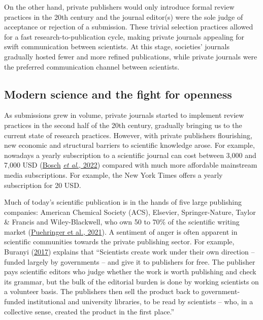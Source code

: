 \documentclass[
]{book}
\begin{document}
On the other hand, private publishers would only introduce formal review practices in the 20th century and the journal editor(s) were the sole judge of acceptance or rejection of a submission. These trivial selection practices allowed for a fast research-to-publication cycle, making private journals appealing for swift communication between scientists. At this stage, societies' journals gradually hosted fewer and more refined publications, while private journals were the preferred communication channel between scientists.

\hypertarget{modern-science-and-the-fight-for-openness}{%
\subsection{Modern science and the fight for openness}\label{modern-science-and-the-fight-for-openness}}

As submissions grew in volume, private journals started to implement review practices in the second half of the 20th century, gradually bringing us to the current state of research practices. However, with private publishers flourishing, new economic and structural barriers to scientific knowledge arose. For example, nowadays a yearly subscription to a scientific journal can cost between 3,000 and 7,000 USD (\href{https://www.libraryjournal.com/story/Are-We-There-Yet-Periodicals-Price-Survey-2022}{Bosch} \href{https://www.libraryjournal.com/story/Are-We-There-Yet-Periodicals-Price-Survey-2022}{\emph{et al}., 2022}) compared with much more affordable mainstream media subscriptions. For example, the New York Times offers a yearly subscription for 20 USD.

Much of today's scientific publication is in the hands of five large publishing companies: American Chemical Society (ACS), Elsevier, Springer-Nature, Taylor \& Francis and Wiley-Blackwell, who own 50 to 70\% of the scientific writing market (\href{https://journals.plos.org/plosone/article?id=10.1371/journal.pone.0253226}{Puehringer et al., 2021}). A sentiment of anger is often apparent in scientific communities towards the private publishing sector. For example, Buranyi (\href{https://www.theguardian.com/science/2017/jun/27/profitable-business-scientific-publishing-bad-for-science}{2017}) explains that ``Scientists create work under their own direction -- funded largely by governments -- and give it to publishers for free. The publisher pays scientific editors who judge whether the work is worth publishing and check its grammar, but the bulk of the editorial burden is done by working scientists on a volunteer basis. The publishers then sell the product back to government-funded institutional and university libraries, to be read by scientists -- who, in a collective sense, created the product in the first place.''
\end{document}
